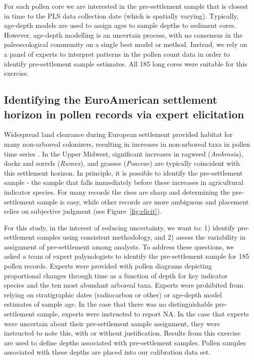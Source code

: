 \documentclass[12pt]{article}
\begin{document}
For each pollen core we are interested in the pre-settlement sample
that is closest in time to the PLS data collection date (which is
spatially varying). Typically, age-depth models are used to assign
ages to sample depths to sediment cores. However, age-depth modelling
is an uncertain process, with no consensus in the paleoecological
community on a single best model or method. Instead, we rely on a
panel of experts to interpret patterns in the pollen count data in
order to identify pre-settlement sample estimates. All 185 long cores were
suitable for this exercise.

\subsection{Identifying the EuroAmerican settlement horizon in pollen records via expert elicitation}
Widespread land clearance during European settlement provided habitat
for many non-arboreal colonizers, resulting in increases in
non-arboreal taxa in pollen time series \citep{mcandrews1988human}. In
the Upper Midwest, significant increases in ragweed
(\textit{Ambrosia}), docks and sorrels (\textit{Rumex}), and grasses
(\textit{Poaceae}) are typically coincident with this settlement
horizon. In principle, it is possible to identify the pre-settlement
sample - the sample that falls immediately before these increases in
agricultural indicator species. For many records the rises are sharp
and determining the pre-settlement sample is easy, while other records
are more ambiguous and placement relies on subjective judgment (see
Figure~\ref{fig:elicit}).

For this study, in the interest of reducing uncertainty, we want to:
1) identify pre-settlement samples using consistent methodology, and
2) assess the variability in assignment of pre-settlement among
analysts. To address these questions, we asked a team of expert
palynologists to identify the pre-settlement sample for 185 pollen
records. Experts were provided with pollen diagrams depicting
proportional changes through time as a function of depth for key
indicator species and the ten most abundant arboreal taxa. Experts
were prohibited from relying on stratigraphic dates (radiocarbon or
other) or age-depth model estimates of sample age. In the case that
there was no distinguishable pre-settlement sample, experts were
instructed to report NA. In the case that experts were uncertain about
their pre-settlement sample assignment, they were instructed to note
this, with or without justification. Results from this exercise are
used to define depths associated with pre-settlement samples. Pollen
samples associated with these depths are placed into our calibration
data set.
\end{document}
